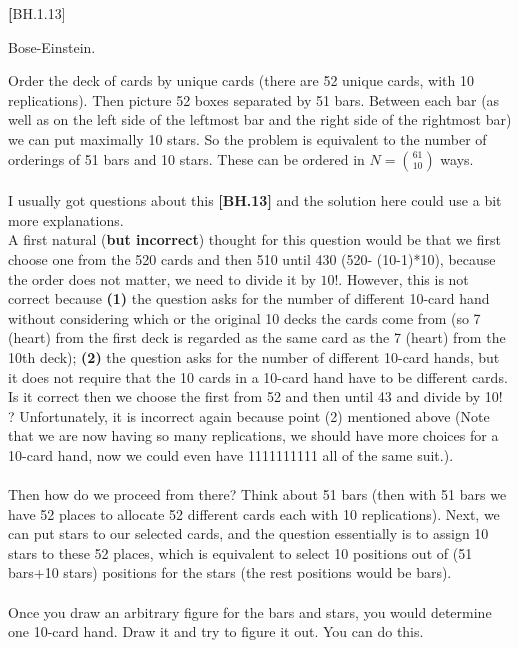 
\setcounter{theorem}{12}
\begin{exercise}\textbf[BH.1.13]
\begin{hint}
	Bose-Einstein.	
\end{hint}
\begin{solution}
	Order the deck of cards by unique cards (there are 52 unique cards, with 10 replications). Then picture 52 boxes separated by 51 bars. Between each bar (as well as on the left side of the leftmost bar and the right side of the rightmost bar) we can put maximally 10 stars. So the problem is equivalent to the number of orderings of 51 bars and 10 stars. These can be ordered in $N={61 \choose 10}$ ways.\\~\\
	
	I usually got questions about this \textbf{[BH.13]} and the solution here could use a bit more explanations.\\ A first natural (\textbf{but incorrect}) thought for this question would be that we first choose one from the 520 cards and then 510 until 430 (520- (10-1)*10), because the order does not matter, we need to divide it by $10!$. However, this is not correct because \textbf{(1)} the question asks for the number of different 10-card hand without considering which or the original 10 decks the cards come from (so 7 (heart) from the first deck is regarded as the same card as the 7 (heart) from the 10th deck); \textbf{(2)} the question asks for the number of different 10-card hands, but it does not require that the 10 cards in a 10-card hand have to be different cards. Is it correct then we choose the first from 52 and then until 43 and divide by 10! ?  Unfortunately, it is incorrect again because point (2) mentioned above (Note that we are now having so many replications, we should have more choices for a 10-card hand, now we could even have 1111111111 all of the same suit.). \\~\\
	 Then how do we proceed from there? Think about 51 bars (then with 51 bars we have 52 places to allocate 52 different cards each with 10 replications). Next, we can put stars to our selected cards, and the question essentially is to assign 10 stars to these 52 places, which is equivalent to select 10 positions out of (51 bars+10 stars) positions for the stars (the rest positions would be bars).\\~\\ 
	 Once you draw an arbitrary figure for the bars and stars, you would determine one 10-card hand. Draw it and try to figure it out. You can do this.     
\end{solution}
\end{exercise}


